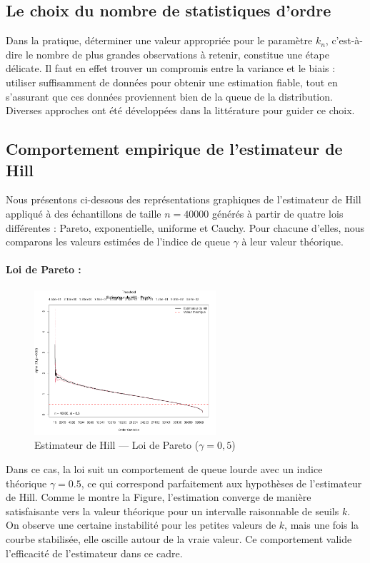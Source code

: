\documentclass{article}
\theoremstyle{plain}
\theoremstyle{definition}
\theoremstyle{plain}
\begin{document}
\subsection{Le choix du nombre de statistiques d’ordre}

Dans la pratique, déterminer une valeur appropriée pour le paramètre $k_n$, c’est-à-dire le nombre de plus grandes observations à retenir, constitue une étape délicate. Il faut en effet trouver un compromis entre la variance et le biais : utiliser suffisamment de données pour obtenir une estimation fiable, tout en s’assurant que ces données proviennent bien de la queue de la distribution. Diverses approches ont été développées dans la littérature pour guider ce choix.

\subsection{Comportement empirique de l’estimateur de Hill}

Nous présentons ci-dessous des représentations graphiques de l’estimateur de Hill appliqué à des échantillons de taille $n = 40000$ générés à partir de quatre lois différentes : Pareto, exponentielle, uniforme et Cauchy. Pour chacune d’elles, nous comparons les valeurs estimées de l’indice de queue $\gamma$ à leur valeur théorique.

\paragraph{Loi de Pareto :}
\begin{figure}[H]
    \centering
    \includegraphics[width=0.6\textwidth]{./images/hill_pareto.png}
    \caption{Estimateur de Hill — Loi de Pareto ($\gamma = 0{,}5$)}
\end{figure}

Dans ce cas, la loi suit un comportement de queue lourde avec un indice théorique $\gamma = 0.5$, ce qui correspond parfaitement aux hypothèses de l’estimateur de Hill. Comme le montre la Figure, l’estimation converge de manière satisfaisante vers la valeur théorique pour un intervalle raisonnable de seuils $k$. On observe une certaine instabilité pour les petites valeurs de $k$, mais une fois la courbe stabilisée, elle oscille autour de la vraie valeur. Ce comportement valide l'efficacité de l’estimateur dans ce cadre.
\end{document}
